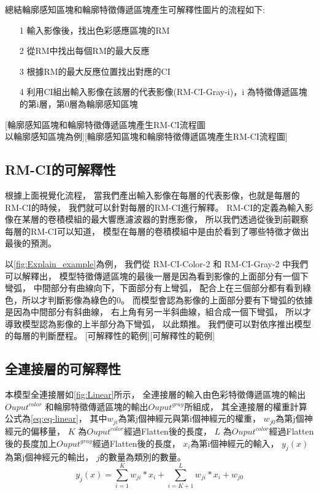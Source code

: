 \documentclass[class=NCU_thesis, crop=false]{standalone}
\begin{document}
	總結輪廓感知區塊和輪廓特徵傳遞區塊產生可解釋性圖片的流程如下:
	\begin{itemize}
		\item [1]
		輸入影像後，找出色彩感應區塊的RM
		\item [2]
		從RM中找出每個RM的最大反應
		\item [3]
		根據RM的最大反應位置找出對應的CI
		\item [4]
		利用CI組出輸入影像在該層的代表影像(RM-CI-Gray-i)，i 為特徵傳遞區塊的第i層，第0層為輪廓感知區塊
	\end{itemize}

	[輪廓感知區塊和輪廓特徵傳遞區塊產生RM-CI流程圖 \\ 
	以輪廓感知區塊為例][輪廓感知區塊和輪廓特徵傳遞區塊產生RM-CI流程圖]

\pagebreak

	\subsection{RM-CI的可解釋性}
	根據上面視覺化流程，
	當我們產出輸入影像在每層的代表影像，也就是每層的RM-CI的時候，
	我們就可以針對每層的RM-CI進行解釋。
	RM-CI的定義為輸入影像在某層的卷積模組的最大響應濾波器的對應影像，
	所以我們透過從後到前觀察每層的RM-CI可以知道，
	模型在每層的卷積模組中是由於看到了哪些特徵才做出最後的預測。

	以\cref{fig:Explain_example}為例，
	我們從 RM-CI-Color-2 和 RM-CI-Gray-2 中我們可以解釋出，
	模型特徵傳遞區塊的最後一層是因為看到影像的上面部分有一個下彎弧，
	中間部分有曲線向下，下面部分有上彎弧，
	配合上在三個部分都有看到綠色，所以才判斷影像為綠色的0。
	而模型會認為影像的上面部分要有下彎弧的依據是因為中間部分有斜曲線，
	右上角有另一半斜曲線，組合成一個下彎弧，
	所以才導致模型認為影像的上半部分為下彎弧，
	以此類推。
	我們便可以對依序推出模型的每層的判斷歷程。
	[可解釋性的範例][可解釋性的範例]

\pagebreak

\subsection{全連接層的可解釋性}
本模型全連接層如\cref{fig:Linear}所示，
全連接層的輸入由色彩特徵傳遞區塊的輸出$Ouput^{color}$
和輪廓特徵傳遞區塊的輸出$Ouput^{gray}$所組成，
其全連接層的權重計算公式為\cref{eq:eq-linear}，
其中$w_{ji}$為第j個神經元與第i個神經元的權重，
$w_{j0}$為第j個神經元的偏移量，
$K$ 為$Ouput^{color}$經過Flatten後的長度，
$L$ 為$Ouput^{color}$經過Flatten後的長度加上$Ouput^{gray}$經過Flatten後的長度，
$x_{i}$為第i個神經元的輸入，
$y_{j}(x)$為第j個神經元的輸出，
$j$的數量為類別的數量。
\begin{equation}
    \label{eq:eq-linear}
    y_{j}(x) = \sum_{i=1}^{K}w_{ji} * x_{i} + \sum_{i=K+1}^{L}w_{ji} * x_{i} + w_{j0}
\end{equation}
\end{document}

